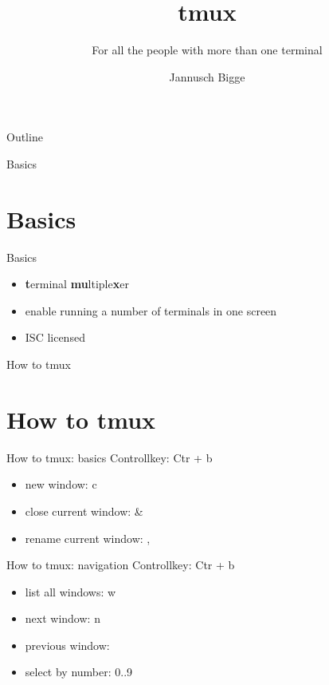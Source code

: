 \documentclass[10pt,graphics,aspectratio=169,table]{beamer}
\title{tmux}
\subtitle{For all the people with more than one terminal}
\author{Jannusch Bigge}
\begin{document}
\begin{frame}
    \maketitle
\end{frame}

\begin{frame}{Outline}
    \tableofcontents
\end{frame}

\begin{frame}{Basics}
    \section{Basics}
\end{frame}

\begin{frame}{Basics}
    \begin{itemize}
        \item \textbf{t}erminal \textbf{mu}ltiple\textbf{x}er
        \item enable running a number of terminals in one screen
        \item ISC licensed
    \end{itemize}
\end{frame}

\begin{frame}{How to tmux}
    \section{How to tmux}
\end{frame}

\begin{frame}{How to tmux: basics}
    Controllkey: Ctr + b
    \begin{itemize}
        \item new window: c
        \item close current window: \&
        \item rename current window: ,
    \end{itemize}
\end{frame}

\begin{frame}{How to tmux: navigation}
    Controllkey: Ctr + b
    \begin{itemize}
        \item list all windows: w
        \item next window: n
        \item previous window: 
        \item select by number: 0..9
    \end{itemize}
\end{frame}
\end{document}
